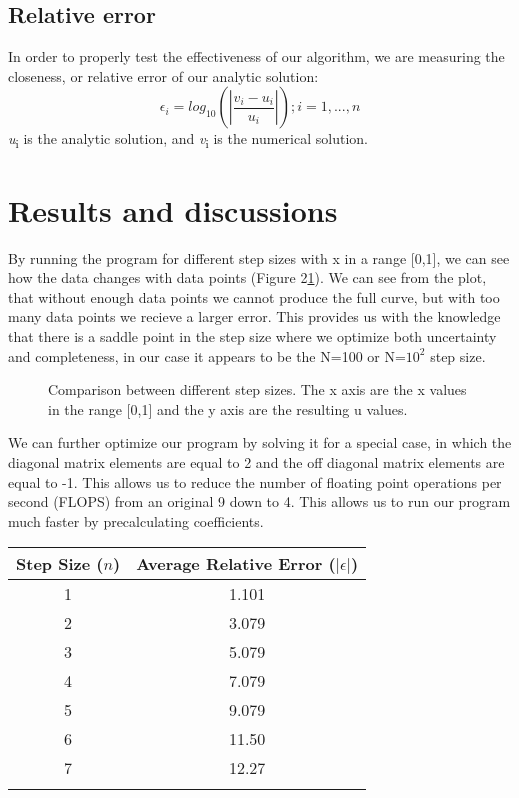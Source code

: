 \documentclass[10pt,showpacs,preprintnumbers,footinbib,amsmath,amssymb,aps,prl,twocolumn,groupedaddress,superscriptaddress,showkeys]{revtex4-1}
\begin{document}
	\subsection{Relative error}
In order to properly test the effectiveness of our algorithm, we are measuring the closeness, or relative error of our analytic solution:
	\begin{equation}
	\epsilon_{i} = log_{10}(|\frac{v_{i}-u_{i}}{u_{i}}|)  ; i = 1,...,n
	\label{error}
	\end{equation}
{\it u}\textsubscript{i} is the analytic solution, and {\it v}\textsubscript{i} is the numerical solution.

\section{Results and discussions}

  By running the program for different step sizes with x in a range [0,1], we can see how the data changes with data points (Figure 2\ref{uvx}).    We can see from the plot, that without enough data points we cannot produce the full curve, but with too many data points we recieve a larger error.  This provides us with the knowledge that there is a saddle point in the step size where we optimize both uncertainty and completeness, in our case it appears to be the N=100 or N=$10^{2}$ step size.

\begin{figure}[!ht]
	\centering
	\label{uvx}
	\caption{Comparison between different step sizes.  The x axis are the x values in the range [0,1] and the y axis are the resulting u values.}
\end{figure}

We can further optimize our program by solving it for a special case, in which the diagonal matrix elements are equal to 2 and the off diagonal matrix elements are equal to -1.  This allows us to reduce the number of floating point operations per second (FLOPS) from an original 9 down to 4.  This allows us to run our program much faster by precalculating coefficients.




\begin{center}
	\begin{tabular}{cc}
		\hline \hline
			Step Size ($n$) &  Average Relative Error ($|\epsilon|$)\\
			\hline
			1 & 1.101\\
			2 & 3.079\\
			3 & 5.079\\
			4 & 7.079\\
			5 & 9.079\\
			6 & 11.50\\
			7 & 12.27\\
			\hline
			\label{errortable}
	\end{tabular}
\end{center}
	
\end{document}

